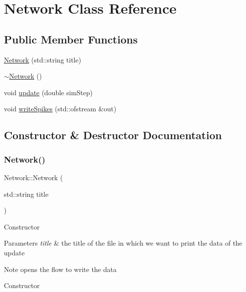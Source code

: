\hypertarget{class_network}{}\section{Network Class Reference}
\label{class_network}
\subsection*{Public Member Functions}
\begin{DoxyCompactItemize}
\item 
\hyperlink{class_network_ac067f2575e351b3bf3f7984e28dc17f3}{Network} (std\+::string title)
\item 
\hyperlink{class_network_a7a4e19cdb4bf0c7ecf82baa643831492}{$\sim$\+Network} ()
\item 
void \hyperlink{class_network_a7ff4ea46a5eeafd9d9f16add01cb06b7}{update} (double sim\+Step)
\item 
void \hyperlink{class_network_a4963f8d1528bbb233b37b24f90f00560}{write\+Spikes} (std\+::ofstream \&out)
\end{DoxyCompactItemize}


\subsection{Constructor \& Destructor Documentation}
\mbox{\label{class_network_ac067f2575e351b3bf3f7984e28dc17f3}} 
\subsubsection{\texorpdfstring{Network()}{Network()}}
{\footnotesize\ttfamily Network\+::\+Network (\begin{DoxyParamCaption}\item[{std\+::string}]{title }\end{DoxyParamCaption})}

Constructor


\begin{DoxyParams}{Parameters}
{\em title} & the title of the file in which we want to print the data of the update\\
\hline
\end{DoxyParams}
\begin{DoxyNote}{Note}
opens the flow to write the data
\end{DoxyNote}
Constructor


